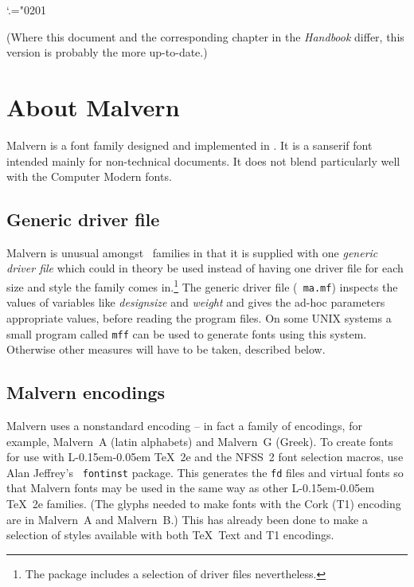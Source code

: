 \def\pt{\,{\rm  pt}} \mathcode`.="0201
\def\La{L\kern-0.15em\flushtop{a}}
\def\LaTeX{\La\kern-0.05em \TeX}

%
%

\bigskip


\bigskip

	(Where this document and the corresponding chapter in the {\it
	Handbook} differ, this version is probably the more up-to-date.)

\section{About Malvern}
	Malvern is a font family designed and implemented in \MF.  It is
	a sanserif font intended mainly for non-technical documents.  It
	does not blend particularly well with the Computer Modern fonts.

\subsection{Generic driver file}
	Malvern is unusual amongst \MF\ families in that it is supplied
	with one {\it generic driver file} which could in theory be used
	instead of having one driver file for each size and style the
	family comes in.\footnote*{The package includes a selection of
	driver files nevertheless.} The generic driver file ({\tt
	ma.mf}) inspects the values of variables like {\it designsize}
	and {\it weight} and gives the ad-hoc parameters appropriate
	values, before reading the program files.  On some UNIX systems
	a small program called {\tt mff} can be used to generate fonts
	using this system.  Otherwise other measures will have to be
	taken, described below.

\subsection{Malvern encodings}
	Malvern uses a nonstandard encoding -- in fact a family of
	encodings, for example, Malvern~A (latin alphabets) and
	Malvern~G (Greek).  To create fonts for use with \LaTeX~2e and
	the NFSS~2 font selection macros, use Alan Jeffrey's {\tt
	fontinst} package.  This generates the {\tt fd} files and
	virtual fonts so that Malvern fonts may be used in the same way
	as other \LaTeX~2e families.  (The glyphs needed to make fonts
	with the Cork (T1) encoding are in Malvern~A and Malvern~B.)
	This has already been done to make a selection of styles
	available with both \TeX\ Text and T1 encodings.

